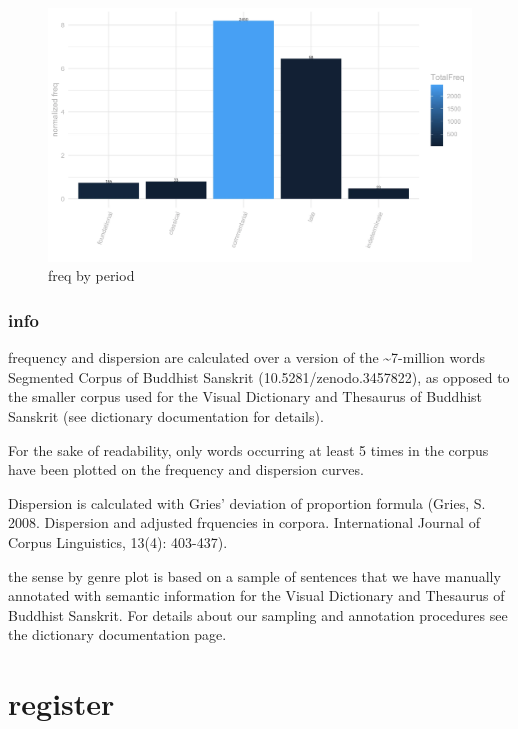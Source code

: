 \documentclass[
  letterpaper,
  DIV=11,
  numbers=noendperiod,
  oneside]{scrreprt}
\begin{document}
\begin{figure}

{\centering \includegraphics{./www/PeriodFreq_vyavahAra.webp}

}

\caption{\label{fig-periodBars}freq by period}

\end{figure}

\hypertarget{sec-disperioninfo}{%
\subsubsection{info}\label{sec-disperioninfo}}

frequency and dispersion are calculated over a version of the
\textasciitilde7-million words Segmented Corpus of Buddhist Sanskrit
(10.5281/zenodo.3457822), as opposed to the smaller corpus used for the
Visual Dictionary and Thesaurus of Buddhist Sanskrit (see dictionary
documentation for details).

For the sake of readability, only words occurring at least 5 times in
the corpus have been plotted on the frequency and dispersion curves.

Dispersion is calculated with Gries' deviation of proportion formula
(Gries, S. 2008. Dispersion and adjusted frquencies in corpora.
International Journal of Corpus Linguistics, 13(4): 403-437).

the sense by genre plot is based on a sample of sentences that we have
manually annotated with semantic information for the Visual Dictionary
and Thesaurus of Buddhist Sanskrit. For details about our sampling and
annotation procedures see the dictionary documentation page.

\hypertarget{sec-register}{%
\section{register}\label{sec-register}}
\end{document}
